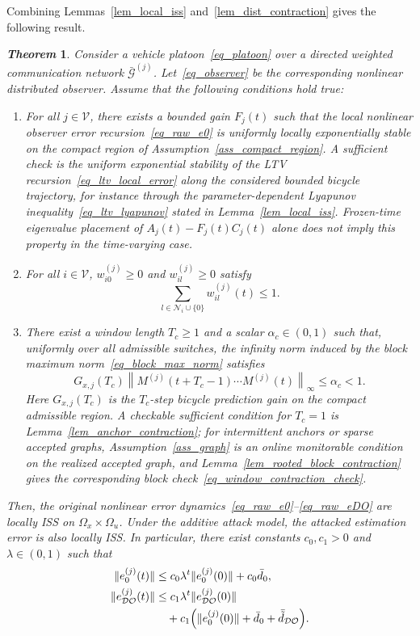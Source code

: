 \documentclass[letterpaper,journal]{IEEEtran}
\def\V{\mathcal{V}} %
\def\G{\mathcal{G}} %
\def\N{\mathcal{N}} %
\def\DO{\mathcal{DO}} %
\newtheorem{theorem}{\it Theorem}%
\begin{document}
Combining Lemmas~\ref{lem_local_iss} and~\ref{lem_dist_contraction} gives the following result.
\begin{theorem}\label{thm_observer}
Consider a vehicle platoon~\eqref{eq_platoon} over a directed weighted communication network $\bar{\G}^{(j)}$. Let~\eqref{eq_observer} be the corresponding nonlinear distributed observer. Assume that the following conditions hold true:
\begin{enumerate}
    \item For all $j \in \V$, there exists a bounded gain $F_{j}(t)$ such that the local nonlinear observer error recursion~\eqref{eq_raw_e0} is uniformly locally exponentially stable on the compact region of Assumption~\ref{ass_compact_region}. A sufficient check is the uniform exponential stability of the LTV recursion~\eqref{eq_ltv_local_error} along the considered bounded bicycle trajectory, for instance through the parameter-dependent Lyapunov inequality~\eqref{eq_ltv_lyapunov} stated in Lemma~\ref{lem_local_iss}. Frozen-time eigenvalue placement of $A_j(t)-F_j(t)C_j(t)$ alone does not imply this property in the time-varying case.
    \item For all $i \in \V$, $w_{i0}^{(j)} \geq 0$ and $w_{il}^{(j)} \geq 0$ satisfy
    \begin{equation}\label{thm_W}%
    \sum_{l\in \N_i\cup\{0\}} w_{il}^{(j)}(t) \leq 1.
    \end{equation}
    \item There exist a window length $T_c\ge1$ and a scalar $\alpha_c\in(0,1)$ such that, uniformly over all admissible switches, the infinity norm induced by the block maximum norm~\eqref{eq_block_max_norm} satisfies
    \begin{equation} \label{assume3}
    G_{x,j}(T_c)
    \left\|M^{(j)}(t+T_c-1)\cdots M^{(j)}(t)\right\|_\infty
    \le \alpha_c<1.
    \end{equation}
    Here $G_{x,j}(T_c)$ is the $T_c$-step bicycle prediction gain on the compact admissible region. A checkable sufficient condition for $T_c=1$ is Lemma~\ref{lem_anchor_contraction}; for intermittent anchors or sparse accepted graphs, Assumption~\ref{ass_graph} is an online monitorable condition on the realized accepted graph, and Lemma~\ref{lem_rooted_block_contraction} gives the corresponding block check~\eqref{eq_window_contraction_check}.
\end{enumerate}
Then, the original nonlinear error dynamics~\eqref{eq_raw_e0}--\eqref{eq_raw_eDO} are locally ISS on $\Omega_x\times\Omega_u$. Under the additive attack model, the attacked estimation error is also locally ISS. In particular, there exist constants $c_0, c_1 > 0$ and $\lambda \in (0,1)$ such that
\begin{align}
\|e_0^{(j)}(t)\| &\le c_0\lambda^t \|e_0^{(j)}(0)\| + c_0 \bar{d}_0,\\
\|e_{\DO}^{(j)}(t)\| &\le c_1\lambda^t \|e_{\DO}^{(j)}(0)\| \notag\\
&\quad+ c_1 \Big(\|e_0^{(j)}(0)\| + \bar{d}_0 + \bar{\tilde d}_{\DO}\Big).
\end{align}

\end{theorem}
\end{document}
